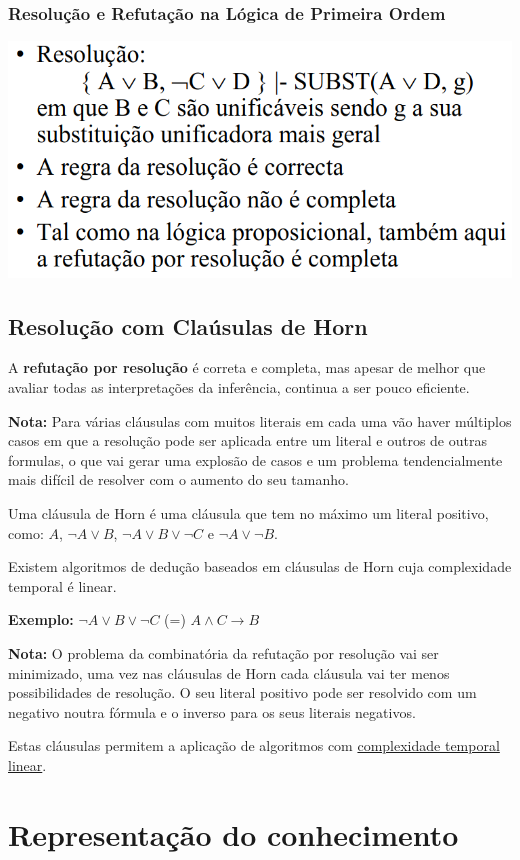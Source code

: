 \documentclass{article}
\begin{document}
\subsubsection{Resolução e Refutação
na Lógica de Primeira Ordem}

\begin{center}
  \includegraphics[scale=0.3]{39}
\end{center}

\subsection{Resolução com Claúsulas de Horn}

A \textbf{refutação por resolução} é correta e completa, mas apesar de melhor que avaliar todas as
interpretações da inferência, continua a ser pouco eficiente.

\begin{flushleft}
  \textbf{Nota:} Para várias cláusulas com muitos literais em cada uma vão haver múltiplos casos em que a resolução pode ser
  aplicada entre um literal e outros de outras formulas, o que vai gerar uma explosão de casos e um problema
  tendencialmente mais difícil de resolver com o aumento do seu tamanho.
\end{flushleft}

Uma cláusula de Horn é uma cláusula que tem
no máximo um literal positivo, como: $A$, $\neg A \vee B$, $\neg A \vee B \vee \neg C$ e
$\neg A \vee \neg B$.

Existem algoritmos de dedução baseados em
cláusulas de Horn cuja complexidade temporal
é linear.

\begin{flushleft}
  \textbf{Exemplo:} $\neg A \vee B \vee \neg C$ (=) $A \wedge C \rightarrow B$
\end{flushleft}

\begin{flushleft}
  \textbf{Nota:} O problema da combinatória da refutação por resolução vai ser minimizado, uma vez nas cláusulas de Horn cada
  cláusula vai ter menos possibilidades de resolução. O seu literal positivo pode ser resolvido com um negativo noutra
  fórmula e o inverso para os seus literais negativos.
\end{flushleft}

Estas cláusulas permitem a aplicação de algoritmos com \uline{complexidade temporal linear}.

\section{Representação do conhecimento}
\end{document}

